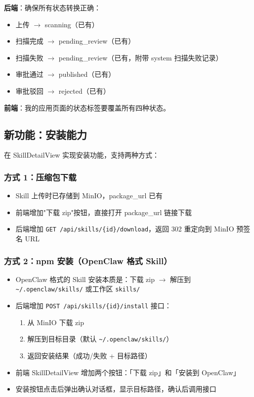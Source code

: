 \documentclass[11pt,a4paper]{article}
\begin{document}
\textbf{后端}：确保所有状态转换正确：
\begin{itemize}[nosep]
  \item 上传 $\to$ scanning（已有）
  \item 扫描完成 $\to$ pending\_review（已有）
  \item 扫描失败 $\to$ pending\_review（已有，附带 system 扫描失败记录）
  \item 审批通过 $\to$ published（已有）
  \item 审批驳回 $\to$ rejected（已有）
\end{itemize}

\textbf{前端}：我的应用页面的状态标签要覆盖所有四种状态。

\subsection{新功能：安装能力}

在 SkillDetailView 实现安装功能，支持两种方式：

\subsubsection{方式 1：压缩包下载}

\begin{itemize}[nosep]
  \item Skill 上传时已存储到 MinIO，package\_url 已有
  \item 前端增加"下载 zip"按钮，直接打开 package\_url 链接下载
  \item 后端增加 \texttt{GET /api/skills/\{id\}/download}，返回 302 重定向到 MinIO 预签名 URL
\end{itemize}

\subsubsection{方式 2：npm 安装（OpenClaw 格式 Skill）}

\begin{itemize}[nosep]
  \item OpenClaw 格式的 Skill 安装本质是：下载 zip $\to$ 解压到 \texttt{\textasciitilde/.openclaw/skills/} 或工作区 \texttt{skills/}
  \item 后端增加 \texttt{POST /api/skills/\{id\}/install} 接口：
  \begin{enumerate}[nosep]
    \item 从 MinIO 下载 zip
    \item 解压到目标目录（默认 \texttt{\textasciitilde/.openclaw/skills/}）
    \item 返回安装结果（成功/失败 + 目标路径）
  \end{enumerate}
  \item 前端 SkillDetailView 增加两个按钮：「下载 zip」和「安装到 OpenClaw」
  \item 安装按钮点击后弹出确认对话框，显示目标路径，确认后调用接口
\end{itemize}
\end{document}
